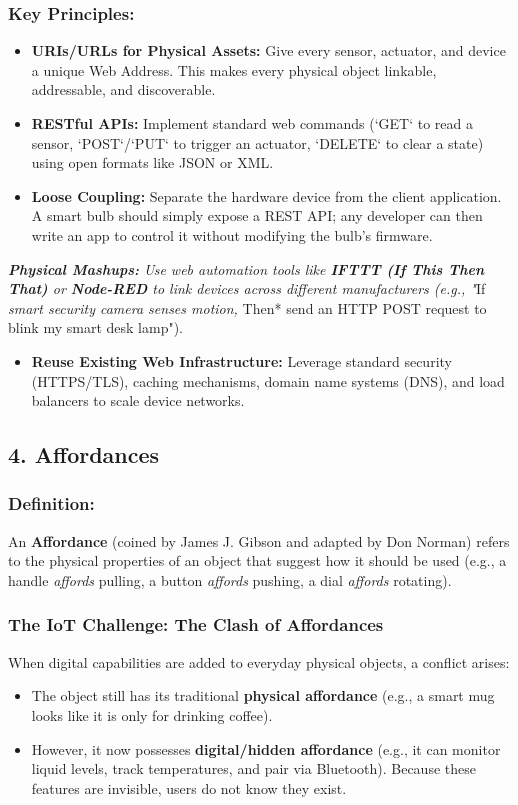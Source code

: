 \subsubsection{Key Principles:}
\begin{itemize}
  \item   \textbf{URIs/URLs for Physical Assets:} Give every sensor, actuator, and device a unique Web Address. This makes every physical object linkable, addressable, and discoverable.
  \item   \textbf{RESTful APIs:} Implement standard web commands (`GET` to read a sensor, `POST`/`PUT` to trigger an actuator, `DELETE` to clear a state) using open formats like JSON or XML.
  \item   \textbf{Loose Coupling:} Separate the hardware device from the client application. A smart bulb should simply expose a REST API; any developer can then write an app to control it without modifying the bulb's firmware.
\end{itemize}
\textit{   \textbf{Physical Mashups:} Use web automation tools like \textbf{IFTTT (If This Then That)} or \textbf{Node-RED} to link devices across different manufacturers (e.g., "}If\textit{ smart security camera senses motion, }Then* send an HTTP POST request to blink my smart desk lamp").
\begin{itemize}
  \item   \textbf{Reuse Existing Web Infrastructure:} Leverage standard security (HTTPS/TLS), caching mechanisms, domain name systems (DNS), and load balancers to scale device networks.
\end{itemize}


\subsection{4. Affordances}

\subsubsection{Definition:}
An \textbf{Affordance} (coined by James J. Gibson and adapted by Don Norman) refers to the physical properties of an object that suggest how it should be used (e.g., a handle \textit{affords} pulling, a button \textit{affords} pushing, a dial \textit{affords} rotating).

\subsubsection{The IoT Challenge: The Clash of Affordances}
When digital capabilities are added to everyday physical objects, a conflict arises:
\begin{itemize}
  \item   The object still has its traditional \textbf{physical affordance} (e.g., a smart mug looks like it is only for drinking coffee).
  \item   However, it now possesses \textbf{digital/hidden affordance} (e.g., it can monitor liquid levels, track temperatures, and pair via Bluetooth). Because these features are invisible, users do not know they exist.
\end{itemize}

